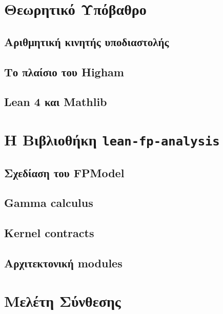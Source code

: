 \documentclass[a4paper,12pt]{article}
\begin{document}
\section{Θεωρητικό Υπόβαθρο}
\subsection{Αριθμητική κινητής υποδιαστολής}
\subsection{Το πλαίσιο του Higham}
\subsection{Lean 4 και Mathlib}

\section{Η Βιβλιοθήκη \texttt{lean-fp-analysis}}
\subsection{Σχεδίαση του FPModel}
\subsection{Gamma calculus}
\subsection{Kernel contracts}
\subsection{Αρχιτεκτονική modules}

\section{Μελέτη Σύνθεσης}

\end{document}
